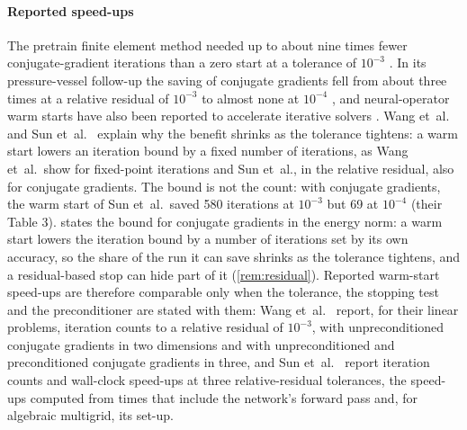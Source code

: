 \paragraph{Reported speed-ups}
The pretrain finite element method needed up to about nine times fewer conjugate-gradient
iterations than a zero start at a tolerance of $10^{-3}$ \cite{Wang2026PretrainFEM}. In its
pressure-vessel follow-up the saving of conjugate gradients fell from about three times at a
relative residual of $10^{-3}$ to almost none at $10^{-4}$ \cite{Sun2026FEVessel}, and
neural-operator warm starts have also been reported to accelerate iterative solvers
\cite{Eshaghi2026NOWS}. Wang et~al.~\cite{Wang2026PretrainFEM} and Sun
et~al.~\cite{Sun2026FEVessel} explain why the benefit shrinks as the tolerance tightens: a
warm start lowers an iteration bound by a fixed number of iterations, as Wang et~al.\ show
for fixed-point iterations and Sun et~al., in the relative residual, also for conjugate
gradients. The bound is not the count: with conjugate gradients, the warm start of Sun
et~al.\ saved 580 iterations at $10^{-3}$ but 69 at $10^{-4}$ (their Table 3).
 states the bound for conjugate gradients in the energy norm: a warm start
lowers the iteration bound by a number of iterations set by its own accuracy, so the share
of the run it can save shrinks as the tolerance tightens, and a residual-based stop can hide
part of it (\cref{rem:residual}). Reported warm-start speed-ups are therefore comparable
only when the tolerance, the stopping test and the preconditioner are stated with them: Wang
et~al.~\cite{Wang2026PretrainFEM} report, for their linear problems, iteration counts to a
relative residual of $10^{-3}$, with unpreconditioned conjugate gradients in two dimensions
and with unpreconditioned and preconditioned conjugate gradients in three, and Sun
et~al.~\cite{Sun2026FEVessel} report iteration counts and wall-clock speed-ups at three
relative-residual tolerances, the speed-ups computed from times that include the network's
forward pass and, for algebraic multigrid, its set-up.
